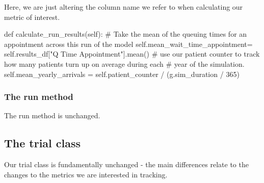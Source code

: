 \documentclass[
  letterpaper,
  DIV=11,
  numbers=noendperiod]{scrreprt}
\newenvironment{Shaded}{\begin{snugshade}}{\end{snugshade}}
\newcommand{\CommentTok}[1]{\textcolor[rgb]{0.37,0.37,0.37}{#1}}
\newcommand{\DecValTok}[1]{\textcolor[rgb]{0.68,0.00,0.00}{#1}}
\newcommand{\KeywordTok}[1]{\textcolor[rgb]{0.00,0.23,0.31}{#1}}
\newcommand{\NormalTok}[1]{\textcolor[rgb]{0.00,0.23,0.31}{#1}}
\newcommand{\OperatorTok}[1]{\textcolor[rgb]{0.37,0.37,0.37}{#1}}
\newcommand{\StringTok}[1]{\textcolor[rgb]{0.13,0.47,0.30}{#1}}
\newcommand{\VariableTok}[1]{\textcolor[rgb]{0.07,0.07,0.07}{#1}}
\begin{document}
Here, we are just altering the column name we refer to when calculating
our metric of interest.

\begin{Shaded}
\begin{Highlighting}[]
    \KeywordTok{def}\NormalTok{ calculate\_run\_results(}\VariableTok{self}\NormalTok{):}
        \CommentTok{\# Take the mean of the queuing times for an appointment across this run of the model}
        \VariableTok{self}\NormalTok{.mean\_wait\_time\_appointment}\OperatorTok{=} \VariableTok{self}\NormalTok{.results\_df[}\StringTok{"Q Time Appointment"}\NormalTok{].mean()}
        \CommentTok{\# use our patient counter to track how many patients turn up on average during each}
        \CommentTok{\# year of the simulation.}
        \VariableTok{self}\NormalTok{.mean\_yearly\_arrivals }\OperatorTok{=} \VariableTok{self}\NormalTok{.patient\_counter }\OperatorTok{/}\NormalTok{ (g.sim\_duration }\OperatorTok{/} \DecValTok{365}\NormalTok{)}
\end{Highlighting}
\end{Shaded}

\subsubsection{The run method}\label{the-run-method-7}

The run method is unchanged.

\subsection{The trial class}\label{the-trial-class-10}

Our trial class is fundamentally unchanged - the main differences relate
to the changes to the metrics we are interested in tracking.
\end{document}

